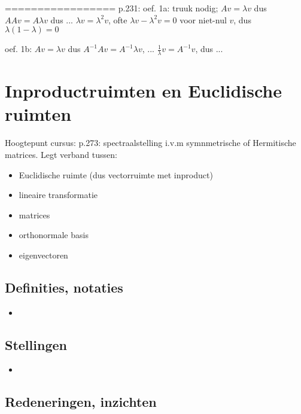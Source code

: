 \documentclass{article}
\begin{document}
=================
p.231: oef. 1a: truuk nodig; $Av=\lambda v$ dus $AAv= A\lambda v$ dus ... $\lambda v = \lambda^2 v$, ofte  $\lambda v - \lambda^2 v = 0$ voor niet-nul $v$, dus $\lambda(1-\lambda)=0$

oef. 1b: $Av=\lambda v$ dus $A^{-1}Av = A^{-1} \lambda v$, ... $\frac{1}{\lambda}v= A^{-1}v$, dus ... 




\section{Inproductruimten en Euclidische ruimten}



Hoogtepunt cursus: p.273: spectraalstelling i.v.m symnmetrische of Hermitische matrices. 
Legt verband tussen: 

\begin{itemize}
    \item Euclidische ruimte (dus vectorruimte met inproduct)
    \item lineaire transformatie
    \item matrices
    \item orthonormale basis
    \item eigenvectoren
\end{itemize}


\subsection{Definities, notaties}
\begin{itemize}
    \item 
\end{itemize}

\subsection{Stellingen}
\begin{itemize}
    \item 
\end{itemize}

\subsection{Redeneringen, inzichten}
\end{document}
